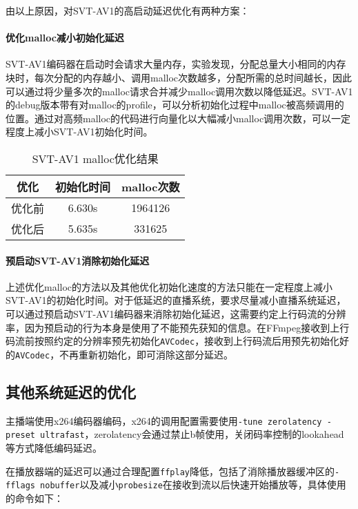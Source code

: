   由以上原因，对SVT-AV1的高启动延迟优化有两种方案：

  \paragraph{优化malloc减小初始化延迟} SVT-AV1编码器在启动时会请求大量内存，实验发现，分配总量大小相同的内存块时，每次分配的内存越小、调用malloc次数越多，分配所需的总时间越长，因此可以通过将少量多次的malloc请求合并减少malloc调用次数以降低延迟。SVT-AV1的debug版本带有对malloc的profile，可以分析初始化过程中malloc被高频调用的位置。通过对高频malloc的代码进行向量化以大幅减小malloc调用次数，可以一定程度上减小SVT-AV1初始化时间。

  \begin{table}[!hpt]
    \caption{SVT-AV1 malloc优化结果}
    \label{tab:malloc}
    \centering
    \begin{tabular}{ccc} \toprule
      优化    & 初始化时间 & malloc次数\\ \midrule
      优化前  & 6.630s   & 1964126  \\
      优化后  & 5.635s   & 331625   \\ \bottomrule
    \end{tabular}
  \end{table}

  \paragraph{预启动SVT-AV1消除初始化延迟} 上述优化malloc的方法以及其他优化初始化速度的方法只能在一定程度上减小SVT-AV1的初始化时间。对于低延迟的直播系统，要求尽量减小直播系统延迟，可以通过预启动SVT-AV1编码器来消除初始化延迟，这需要约定上行码流的分辨率，因为预启动的行为本身是使用了不能预先获知的信息。在FFmpeg接收到上行码流前按照约定的分辨率预先初始化\texttt{AVCodec}，接收到上行码流后用预先初始化好的\texttt{AVCodec}，不再重新初始化，即可消除这部分延迟。

	\subsection{其他系统延迟的优化}
	
	主播端使用x264编码器编码，x264的调用配置需要使用\texttt{-tune zerolatency -preset ultrafast}，zerolatency会通过禁止b帧使用，关闭码率控制的lookahead等方式降低编码延迟。
	
	在播放器端的延迟可以通过合理配置\texttt{ffplay}降低，包括了消除播放器缓冲区的\texttt{-fflags nobuffer}以及减小\texttt{probesize}在接收到流以后快速开始播放等，具体使用的命令如下：
	
